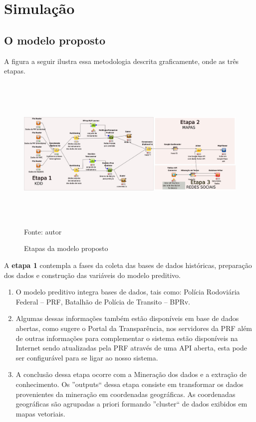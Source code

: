 \chapter{Simulação}\label{simula}


\section{O modelo proposto}

A figura a seguir ilustra essa metodologia descrita graficamente, onde as três etapas.

\begin{figure}[ht]
\centering
\caption{Etapas da modelo proposto}
\includegraphics[width=175mm, height=75mm]{Figuras/Cronograma/metodologia.png}\\
\tiny Fonte: autor
\end{figure}

A \textbf{etapa 1} contempla a fases da coleta das bases de dados históricas, preparação dos dados e construção das variáveis do modelo preditivo.
  \begin{enumerate}
    \item O modelo preditivo integra bases de dados, tais como: Polícia Rodoviária Federal -- PRF, Batalhão de Polícia de Transito -- BPRv.
 
    \item Algumas dessas informações também estão disponíveis em base de dados abertas, como sugere o Portal da Transparência, nos servidores da PRF além de outras
	  informações para complementar o sistema estão disponíveis na Internet sendo atualizadas pela PRF através de uma API aberta, esta pode 
	  ser configurável para se ligar ao nosso sistema.
    \item A conclusão dessa etapa ocorre com a Mineração dos dados e a extração de conhecimento.
	  Os ''outputs`` dessa etapa consiste em transformar os dados provenientes da mineração em coordenadas geográficas. 
	  As coordenadas geográficas são agrupadas a priori formando ''cluster`` de dados exibidos em mapas vetoriais.\\
\end{enumerate}
  
